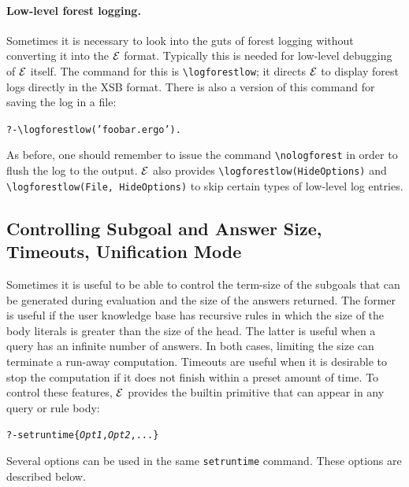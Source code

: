 \documentclass[11pt]{article}
\newcommand{\ERGO}{\mbox{\ensuremath{\cal{E}}\smaller{{\sc{RGO}}}}\xspace}
\newcommand{\FLSYSTEM}{\ERGO}
\newcommand{\ergoext}{ergo\xspace}
\newcommand{\bs}{\textbackslash}
\begin{document}
\paragraph{Low-level forest logging.}
Sometimes it is necessary to look into the guts of forest logging without
converting it into the \FLSYSTEM format. Typically this is needed for
low-level debugging of \FLSYSTEM itself.
The command for this is
{\tt \bs{}logforestlow}; it directs \FLSYSTEM to display forest logs 
directly in the XSB format.
There is also a version of this command for saving the log in a file:
\begin{alltt}
   ?- \bs{}logforestlow('foobar.\ergoext').
\end{alltt}
As before, one should remember to issue the command \texttt{\bs{}nologforest}
in order to flush the log to the output.
\FLSYSTEM also provides {\tt \bs{}logforestlow(HideOptions)} and 
{\tt \bs{}logforestlow(File, HideOptions)} to skip certain types of low-level 
log entries. 

\subsection{Controlling Subgoal and Answer Size, Timeouts, Unification
  Mode}\label{sec-timeout}

Sometimes it is useful to be able to control the term-size of the subgoals
that can be generated during evaluation and the size of the answers
returned. The former is useful if the user knowledge base has recursive
rules in which the size of the body literals is greater than the size of
the head. The latter is useful when a query has an infinite number of
answers. In both cases, limiting the size can terminate a run-away
computation.
Timeouts are useful when it is desirable to stop the computation if it does
not finish within a preset amount of time.
To control these features, \FLSYSTEM provides the builtin primitive that
can appear in any query or rule body:
\begin{alltt}
   ?- setruntime\{\emph{Opt1},\emph{Opt2},...\}
\end{alltt}
Several options can be used in the same \texttt{setruntime} command. 
These options are described below.
\end{document}
